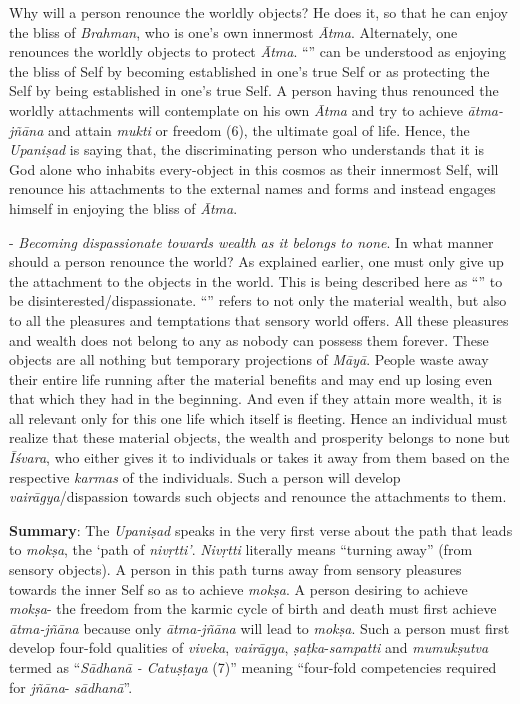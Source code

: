 Why will a person renounce the worldly objects? He does it, so that he can enjoy the bliss of \emph{Brahman}, who is one's own innermost \emph{Ātma}. Alternately, one renounces the worldly objects to protect \emph{Ātma}. ``'' can be understood as enjoying the bliss of Self by becoming established in one's true Self or as protecting the Self by being established in one's true Self. A person having thus renounced the worldly attachments will contemplate on his own \emph{Ātma} and try to achieve \emph{ātma-jñāna} and attain \emph{mukti} or freedom (6), the ultimate goal of life. Hence, the \emph{Upaniṣad} is saying that, the discriminating person who understands that it is God alone who inhabits every-object in this cosmos as their innermost Self, will renounce his attachments to the external names and forms and instead engages himself in enjoying the bliss of \emph{Ātma}.

- \emph{Becoming dispassionate towards wealth as it belongs to none}. In what manner should a person renounce the world? As explained earlier, one must only give up the attachment to the objects in the world. This is being described here as ``'' to be disinterested/dispassionate. ``'' refers to not only the material wealth, but also to all the pleasures and temptations that sensory world offers. All these pleasures and wealth does not belong to any as nobody can possess them forever. These objects are all nothing but temporary projections of \emph{Māyā}. People waste away their entire life running after the material benefits and may end up losing even that which they had in the beginning. And even if they attain more wealth, it is all relevant only for this one life which itself is fleeting. Hence an individual must realize that these material objects, the wealth and prosperity belongs to none but \emph{Īśvara}, who either gives it to individuals or takes it away from them based on the respective \emph{karmas} of the individuals. Such a person will develop \emph{vairāgya}/dispassion towards such objects and renounce the attachments to them.

\textbf{Summary}: The \emph{Upaniṣad} speaks in the very first verse about the path that leads to \emph{mokṣa}, the `path of \emph{nivṛtti'}. \emph{Nivṛtti} literally means ``turning away'' (from sensory objects). A person in this path turns away from sensory pleasures towards the inner Self so as to achieve \emph{mokṣa}. A person desiring to achieve \emph{mokṣa}- the freedom from the karmic cycle of birth and death must first achieve \emph{ātma-jñāna} because only \emph{ātma-jñāna} will lead to \emph{mokṣa}. Such a person must first develop four-fold qualities of \emph{viveka}, \emph{vairāgya}, \emph{ṣaṭka}-\emph{sampatti} and \emph{mumukṣutva} termed as ``\emph{Sādhanā - Catuṣṭaya} (7)'' meaning ``four-fold competencies required for \emph{jñāna}- \emph{sādhanā}''.

